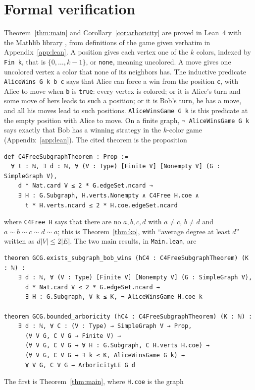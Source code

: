 \documentclass[11pt]{article}
\theoremstyle{remark}
\begin{document}
\section{Formal verification}\label{sec:lean}
Theorem~\ref{thm:main} and Corollary~\ref{cor:arboricity} are proved in
Lean~4 \cite{Lean} with the Mathlib library \cite{Mathlib}, from
definitions of the game given verbatim in Appendix~\ref{app:lean}. A position gives each vertex one of the $k$
colors, indexed by \texttt{Fin k}, that is $\{0,\dots,k-1\}$, or
\texttt{none}, meaning uncolored. A move gives one uncolored vertex a color
that none of its neighbors has. The inductive predicate
\texttt{AliceWins G k b c} says that Alice can force a win from the
position \texttt{c}, with Alice to move when \texttt{b} is \texttt{true}:
every vertex is colored; or it is Alice's turn and some move of hers leads
to such a position; or it is Bob's turn, he has a move, and all his moves
lead to such positions. \texttt{AliceWinsGame G k} is this predicate at
the empty position with Alice to move. On a finite graph,
\texttt{¬ AliceWinsGame G k} says exactly that Bob has a winning strategy
in the $k$-color game (Appendix~\ref{app:lean}). The cited theorem is the
proposition
\begin{verbatim}
def C4FreeSubgraphTheorem : Prop :=
  ∀ t : ℕ, ∃ d : ℕ, ∀ (V : Type) [Finite V] [Nonempty V] (G : SimpleGraph V),
    d * Nat.card V ≤ 2 * G.edgeSet.ncard →
    ∃ H : G.Subgraph, H.verts.Nonempty ∧ C4Free H.coe ∧
      t * H.verts.ncard ≤ 2 * H.coe.edgeSet.ncard
\end{verbatim}
where \texttt{C4Free H} says that there are no $a,b,c,d$ with $a\ne c$,
$b\ne d$ and $a\sim b\sim c\sim d\sim a$; this is Theorem~\ref{thm:ko},
with ``average degree at least $d$'' written as $d|V|\le2|E|$. The two
main results, in \texttt{Main.lean}, are
\begin{verbatim}
theorem GCG.exists_subgraph_bob_wins (hC4 : C4FreeSubgraphTheorem) (K : ℕ) :
    ∃ d : ℕ, ∀ (V : Type) [Finite V] [Nonempty V] (G : SimpleGraph V),
      d * Nat.card V ≤ 2 * G.edgeSet.ncard →
      ∃ H : G.Subgraph, ∀ k ≤ K, ¬ AliceWinsGame H.coe k

theorem GCG.bounded_arboricity (hC4 : C4FreeSubgraphTheorem) (K : ℕ) :
    ∃ d : ℕ, ∀ C : (V : Type) → SimpleGraph V → Prop,
      (∀ V G, C V G → Finite V) →
      (∀ V G, C V G → ∀ H : G.Subgraph, C H.verts H.coe) →
      (∀ V G, C V G → ∃ k ≤ K, AliceWinsGame G k) →
      ∀ V G, C V G → ArboricityLE G d
\end{verbatim}
The first is Theorem~\ref{thm:main}, where \texttt{H.coe} is the graph
\end{document}

